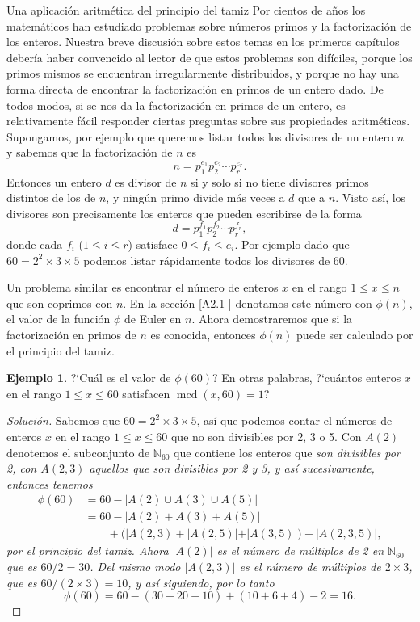 \documentclass[11pt,spanish,makeidx]{amsbook}
\theoremstyle{definition}
\newtheorem{ejemplo}{Ejemplo}[section]
\theoremstyle{remark}
\begin{document}
\begin{section}{Una aplicación aritmética del principio del
tamiz}\label{Ap2.2} Por cientos de años los matemáticos han
estudiado problemas sobre números primos y la factorización de los
enteros. Nuestra breve discusión sobre estos temas en los primeros
capítulos debería haber convencido al lector de que estos
problemas son difíciles, porque los primos mismos se encuentran
irregularmente distribuidos, y porque no hay una forma directa de
encontrar la factorización en primos de un entero dado. De todos
modos, si se nos da la factorización en primos de un entero, es
relativamente fácil responder ciertas preguntas sobre sus
propiedades aritméticas. Supongamos, por ejemplo que queremos
listar todos los divisores de un entero $n$ y sabemos que la
factorización de $n$ es
$$
n=p_1^{e_1}p_2^{e_2}\cdots p_r^{e_r}.
$$
Entonces un entero $d$ es divisor de $n$ si y solo si no tiene
divisores primos distintos de los de $n$, y ningún primo divide
más veces a $d$ que a $n$. Visto así, los divisores son
precisamente los enteros que pueden escribirse de la forma
$$
d=p_1^{f_1}p_2^{f_2}\cdots p_r^{f_r},
$$
donde cada $f_i$ ($1\le i \le r$) satisface $0\le f_i \le e_i$.
Por ejemplo dado que $60= 2^2 \times 3 \times 5$ podemos listar
rápidamente todos los divisores de 60.

Un problema similar es encontrar el número de enteros $x$ en el
rango $1 \le x \le n$ que son coprimos con $n$. En la sección
\ref{A2.1 } denotamos este número con $\phi(n)$, el valor de la
función $\phi$ de Euler en $n$. Ahora demostraremos que si la
factorización en primos de $n$ es conocida, entonces $\phi(n)$
puede ser calculado por el principio del tamiz.

\begin{ejemplo}?`Cuál es el valor de $\phi(60)$? En otras
palabras, ?`cuántos enteros $x$ en el rango $1 \le x \le 60$
satisfacen $\operatorname{mcd}(x,60)=1$?
\end{ejemplo}
\begin{proof}[Solución] Sabemos que $60 =2^2 \times 3 \times 5$, así que
podemos contar el números de enteros $x$ en el rango $1 \le x \le
60$ que no son divisibles por 2, 3 o 5. Con $A(2)$ denotemos el
subconjunto de $\mathbb N_{60}$ que contiene los enteros que \it
son \rm divisibles por 2, con $A(2,3)$ aquellos que \it son \rm
divisibles por 2 y 3, y así sucesivamente, entonces tenemos
$$\begin{aligned}
\phi(60)&=60-|A(2) \cup A(3) \cup A(5)| \\
&= 60-|A(2) + A(3) + A(5)| \\
&\qquad+(|A(2,3) + |A(2,5)| + |A(3,5)|)-|A(2,3,5)|,
\end{aligned}
$$
por el principio del tamiz. Ahora $|A(2)|$ es el número de
múltiplos de 2 en $\mathbb N_{60}$ que es $60 /2 = 30$. Del mismo
modo $|A(2,3)|$ es el número de múltiplos de $2 \times 3$, que es
$60 /(2\times 3) = 10$, y así siguiendo, por lo tanto
$$
\phi(60) = 60 -(30+20+10)+(10+6+4)-2=16.
$$
\end{proof}


\end{section}
\end{document}
